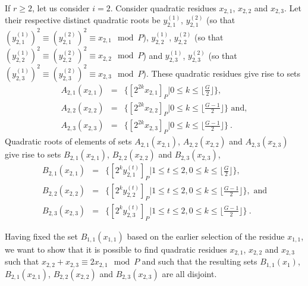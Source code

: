 If $r \geq 2$, let us consider $i=2$. Consider quadratic residues
$x_{2,1}$, $x_{2,2}$ and $x_{2,3}$. Let  their respective distinct
quadratic roots be $y_{2,1}^{(1)}$, $y_{2,1}^{(2)}$ (so that
$(y_{2,1}^{(1)})^2 \equiv (y_{2,1}^{(2)})^2 \equiv x_{2,1} \mod P$),
$y_{2,2}^{(1)}$, $y_{2,2}^{(2)}$ (so that $(y_{2,2}^{(1)})^2 \equiv
(y_{2,2}^{(2)})^2 \equiv x_{2,2} \mod P$) and $y_{2,3}^{(1)}$,
$y_{2,3}^{(2)}$ (so that $(y_{2,3}^{(1)})^2 \equiv (y_{2,3}^{(2)})^2
\equiv x_{2,3} \mod P$). These quadratic residues give rise to sets
\begin{eqnarray}
A_{2,1}(x_{2,1})&=&\{ [2^{2k}x_{2,1}]_P | 0 \leq k \leq \lfloor
\frac{G}{2} \rfloor\},\\ A_{2,2}(x_{2,2})&=& \{ [2^{2k}x_{2,2}]_P |
0
\leq k \leq \lfloor \frac{G-1}{2} \rfloor\} \text{ and},\\
A_{2,3}(x_{2,3})&=& \{ [2^{2k}x_{2,3}]_P | 0 \leq k \leq \lfloor
\frac{G-1}{2} \rfloor\}~.
\end{eqnarray}
Quadratic roots of elements of sets $A_{2,1}(x_{2,1})$,
$A_{2,2}(x_{2,2})$ and $A_{2,3}(x_{2,3})$ give rise to sets
$B_{2,1}(x_{2,1})$, $B_{2,2}(x_{2,2})$ and $B_{2,3}(x_{2,3})$,
\begin{eqnarray}
B_{2,1}(x_{2,1})&=&\{[2^ky_{2,1}^{(t)}]_P | 1 \leq t \leq 2, 0 \leq
k
\leq \lfloor \frac{G}{2}\rfloor\},\\
B_{2,2}(x_{2,2})&=&\{[2^ky_{2,2}^{(t)}]_P | 1 \leq t \leq 2, 0 \leq
k
\leq \lfloor \frac{G-1}{2}\rfloor\}, \text{ and}\\
B_{2,3}(x_{2,3})&=&\{[2^ky_{2,3}^{(t)}]_P | 1 \leq t \leq 2, 0 \leq
k \leq \lfloor \frac{G-1}{2}\rfloor\}~.
\end{eqnarray}


Having fixed the set $B_{1,1}(x_{1,1})$ based on the earlier
selection of the residue $x_{1,1}$, we want to show that it is
possible to find quadratic residues $x_{2,1}$, $x_{2,2}$ and
$x_{2,3}$ such that $x_{2,2} + x_{2,3} \equiv 2x_{2,1} \mod P$ and
such that the resulting sets $B_{1,1}(x_1)$, $B_{2,1}(x_{2,1})$,
$B_{2,2}(x_{2,2})$ and $B_{2,3}(x_{2,3})$ are all disjoint.

